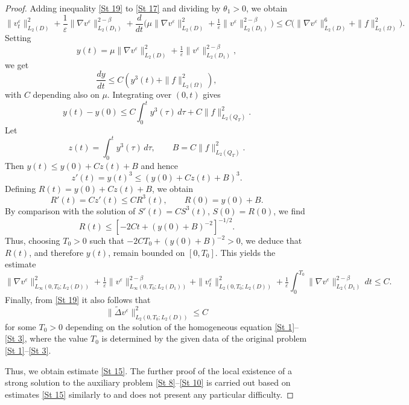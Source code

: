 \documentclass[11pt]{article}
\begin{document}
\begin{proof}
Adding inequality \eqref{St 19} to \eqref{St 17} and dividing by $\theta_1>0$, we obtain  
\[
\| v^{\varepsilon}_{t} \|^{2}_{L_2(D)} + \frac{1}{\varepsilon} \|\nabla v^{\varepsilon}\|^{2-\beta}_{L_2(D_1)} + \frac{d}{dt}\Big( {\mu}\|\nabla v^{\varepsilon} \|^{2}_{L_2(D)} + \tfrac{1}{\varepsilon}\|v^{\varepsilon}\|^{2-\beta}_{L_2 (D_1)}\Big) 
\leq C\big( \|\nabla v^{\varepsilon}\|^{6}_{L_2 (D)} + \|f\|^{2}_{L_2 (\Omega)}\big).
\]
Setting  
\[
y(t)= {\mu}\|\nabla v^{\varepsilon} \|^{2}_{L_2(D)} + \tfrac{1}{\varepsilon}\|v^{\varepsilon}\|^{2-\beta}_{L_2 (D_1)},
\]
we get
\[
\frac{dy}{dt}\leq C \left(y^3(t)+\|f\|^{2}_{L_2 (\Omega)} \right),
\]
{with $C$ depending also on $\mu$.}
Integrating over $(0,t)$ gives  
\[
y(t)-y(0)\leq C\int_0^t y^3(\tau)\,d\tau + C\|f\|^{2}_{L_2 (Q_T)}.
\]
Let  
\[
z(t)=\int_0^t y^3(\tau)\,d\tau, \qquad B=C\|f\|^{2}_{L_2(Q_T)}.
\]
Then $y(t)\le y(0)+Cz(t)+B$ and hence  
\[
z'(t)=y(t)^3 \le (y(0)+Cz(t)+B)^3.
\]
Defining $R(t)=y(0)+Cz(t)+B$, we obtain
\[
R'(t)=Cz'(t)\le C R^3(t), \qquad R(0)=y(0)+B.
\]
By comparison with the solution of $S'(t)=C S^3(t)$, $S(0)=R(0)$, we find
\[
R(t)\le \left[-2Ct+(y(0)+B)^{-2}\right]^{-1/2}.
\]
Thus, choosing $T_0>0$ such that $-2CT_0+(y(0)+B)^{-2}>0$, we deduce that $R(t)$, and therefore $y(t)$, remain bounded on $[0,T_0]$. This yields the estimate
\begin{equation} \label{St 20}
	\|\nabla v^{\varepsilon} \|^2_{L_\infty(0,T_0;L_2(D))} + \tfrac{1}{\varepsilon} \| v^{\varepsilon} \|^{2-\beta}_{L_\infty(0,T_0;L_2(D_1))} + \| v^{\varepsilon}_{t} \|^2_{L_2(0, T_0; L_2(D))} + \tfrac{1}{\varepsilon} \int_0^{T_0} \|\nabla v^{\varepsilon} \|^{2-\beta}_{L_2(D_1)}\,dt \leq C.
\end{equation}
Finally, from \eqref{St 19} it also follows that
\begin{equation} \label{St 21}
	\|\tilde{\Delta} v^{\varepsilon} \|^2_{L_2(0,T_0;L_2(D))} \leq C
\end{equation}
for some $T_0>0$
depending on the solution of the homogeneous equation \eqref{St 1}--\eqref{St 3}, where the value \( T_0 \) is determined by the given data of the original problem \eqref{St 1}--\eqref{St 3}. 

Thus, we obtain estimate \eqref{St 15}. The  further proof of the local existence of a strong solution to the auxiliary problem \eqref{St 8}--\eqref{St 10} %
is carried out based on estimates  \eqref{St 15} similarly to \cite[{section~III.3}]{antontsev1989boundary} and does not present any particular difficulty.
\medskip


\end{proof}
\end{document}
